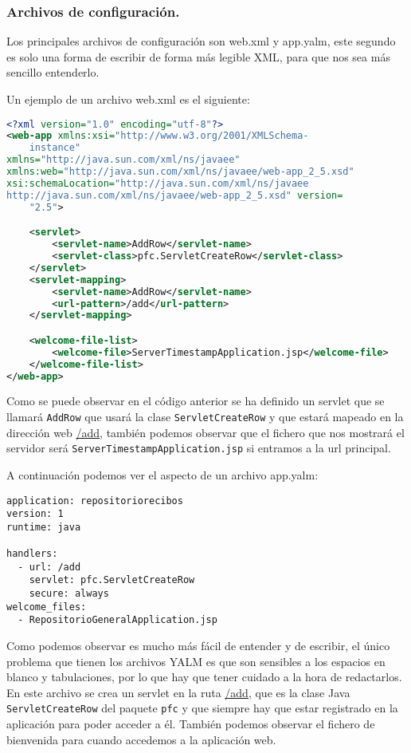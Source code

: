\subsubsection{Archivos de configuración.\label{cap:refArchivosConfiguracionGoogleAppEngine}}
Los principales archivos de configuración son web.xml y app.yalm, este segundo es solo una forma de escribir de forma más legible XML, para que nos sea más sencillo entenderlo.

Un ejemplo de un archivo web.xml es el siguiente:

\begin{lstlisting}[language=XML]
<?xml version="1.0" encoding="utf-8"?>
<web-app xmlns:xsi="http://www.w3.org/2001/XMLSchema-
	instance"
xmlns="http://java.sun.com/xml/ns/javaee"
xmlns:web="http://java.sun.com/xml/ns/javaee/web-app_2_5.xsd"
xsi:schemaLocation="http://java.sun.com/xml/ns/javaee
http://java.sun.com/xml/ns/javaee/web-app_2_5.xsd" version=
	"2.5">

	<servlet>
		<servlet-name>AddRow</servlet-name>
		<servlet-class>pfc.ServletCreateRow</servlet-class>
	</servlet>
	<servlet-mapping>
		<servlet-name>AddRow</servlet-name>
		<url-pattern>/add</url-pattern>
	</servlet-mapping>

	<welcome-file-list>
		<welcome-file>ServerTimestampApplication.jsp</welcome-file>
	</welcome-file-list>
</web-app>
\end{lstlisting}

Como se puede observar en el código anterior se ha definido un servlet que se llamará \lstinline{AddRow} que usará la clase \lstinline{ServletCreateRow} y que estará mapeado en la dirección web \url{/add}, también podemos observar que el fichero que nos mostrará el servidor será \lstinline{ServerTimestampApplication.jsp} si entramos a la url principal.

A continuación podemos ver el aspecto de un archivo app.yalm:

\begin{lstlisting}[style=YAML]
application: repositoriorecibos
version: 1
runtime: java

handlers:
  - url: /add
    servlet: pfc.ServletCreateRow
    secure: always
welcome_files:
  - RepositorioGeneralApplication.jsp
\end{lstlisting}

Como podemos observar es mucho más fácil de entender y de escribir, el único problema que tienen los archivos YALM es que son sensibles a los espacios en blanco y tabulaciones, por lo que hay que tener cuidado a la hora de redactarlos. En este archivo se crea un servlet en la ruta \url{/add}, que es la clase Java \lstinline{ServletCreateRow} del paquete \lstinline{pfc} y que siempre hay que estar registrado en la aplicación para poder acceder a él. También podemos observar el fichero de bienvenida para cuando accedemos a la aplicación web. 

